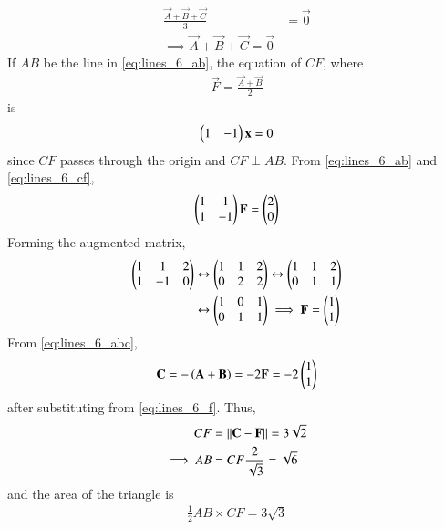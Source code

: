 \documentclass[journal,12pt,twocolumn]{IEEEtran}
\begin{document}
\begin{enumerate}[label=\arabic*]
\begin{align}
\frac{\vec{A}+\vec{B}+\vec{C}}{3} &= \vec{0}
\nonumber \\
\implies 
\vec{A}+\vec{B}+\vec{C} = \vec{0}
\label{eq:lines_6_abc}
\end{align}
%
If $AB$ be the line in \eqref{eq:lines_6_ab},
the equation of 
$CF$, where 
\begin{align}
\vec{F} = \frac{\vec{A}+\vec{B}}{2} 
\end{align}
is 
%
\begin{align}
\label{eq:lines_6_cf}
\begin{pmatrix}1 & -1\end{pmatrix}\mathbf{x} = 0
\end{align}
since $CF$ passes through the origin and $CF\perp AB$. From \eqref{eq:lines_6_ab}
and \eqref{eq:lines_6_cf},
\begin{align}
\label{eq:lines_6_fmat}
\begin{pmatrix}1 & 1 \\1 & -1\end{pmatrix}\mathbf{F} = \begin{pmatrix}2 \\ 0\end{pmatrix}
\end{align}
%
Forming the augmented matrix, 
\begin{align}
\begin{pmatrix}1 & 1 &2 \\1 & -1 & 0\end{pmatrix} &\leftrightarrow \begin{pmatrix}1 & 1 &2 \\0 & 2 & 2\end{pmatrix} \leftrightarrow \begin{pmatrix}1 & 1 &2 \\0 & 1 & 1\end{pmatrix} 
\nonumber \\
&\leftrightarrow \begin{pmatrix}1 & 0 &1 \\0 & 1 & 1\end{pmatrix} \implies \mathbf{F} = \begin{pmatrix}1 \\ 1\end{pmatrix}
\label{eq:lines_6_f}
\end{align}
From \eqref{eq:lines_6_abc},
\begin{align}
\mathbf{C}=-\left(\mathbf{A}+\mathbf{B}\right)=-2\mathbf{F} = -2\begin{pmatrix}1 \\ 1\end{pmatrix}
\label{eq:lines_6_c}
\end{align}
after substituting from \eqref{eq:lines_6_f}.  Thus, 
\begin{align}
CF &= \lVert\mathbf{C}-\mathbf{F}\rVert = 3\sqrt{2} 
\\
\implies AB &=  CF\frac{2}{\sqrt{3}} = \sqrt{6}
\label{eq:lines_6_cflen}
\end{align}
and the area of the triangle is 
\begin{align}
\frac{1}{2} AB \times CF = 3\sqrt{3}
\end{align}



\end{enumerate}
\end{document}
